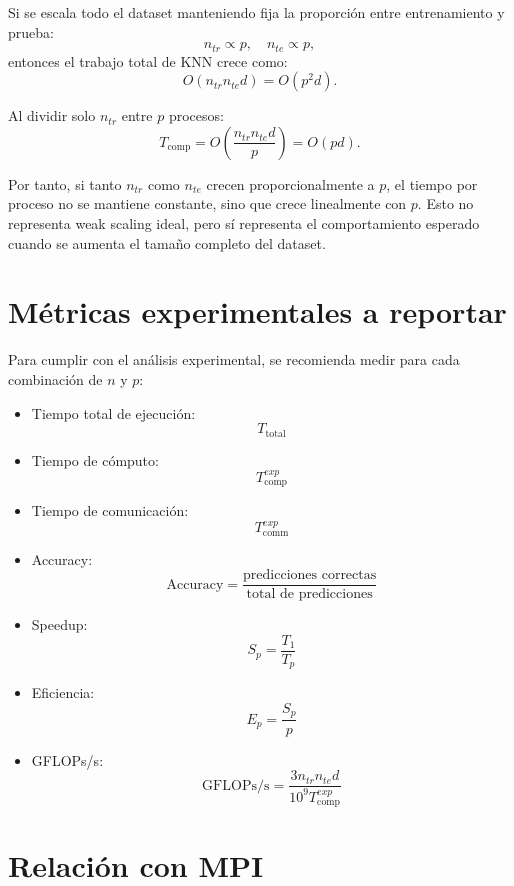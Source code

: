 \documentclass[11pt,a4paper]{article}
\begin{document}
Si se escala todo el dataset manteniendo fija la proporción entre entrenamiento y prueba:
\[
n_{tr} \propto p,
\quad
n_{te} \propto p,
\]
entonces el trabajo total de KNN crece como:
\[
O(n_{tr}n_{te}d) = O(p^2d).
\]

Al dividir solo $n_{tr}$ entre $p$ procesos:
\[
T_{\text{comp}}
=
O\left(
\frac{n_{tr}n_{te}d}{p}
\right)
=
O(pd).
\]

Por tanto, si tanto $n_{tr}$ como $n_{te}$ crecen proporcionalmente a $p$, el tiempo por proceso
no se mantiene constante, sino que crece linealmente con $p$. Esto no representa weak scaling
ideal, pero sí representa el comportamiento esperado cuando se aumenta el tamaño completo del
dataset.

\section{Métricas experimentales a reportar}

Para cumplir con el análisis experimental, se recomienda medir para cada combinación de
$n$ y $p$:

\begin{itemize}
    \item Tiempo total de ejecución:
    \[
    T_{\text{total}}
    \]
    
    \item Tiempo de cómputo:
    \[
    T_{\text{comp}}^{exp}
    \]
    
    \item Tiempo de comunicación:
    \[
    T_{\text{comm}}^{exp}
    \]
    
    \item Accuracy:
    \[
    \mathrm{Accuracy} =
    \frac{\text{predicciones correctas}}{\text{total de predicciones}}
    \]
    
    \item Speedup:
    \[
    S_p =
    \frac{T_1}{T_p}
    \]
    
    \item Eficiencia:
    \[
    E_p =
    \frac{S_p}{p}
    \]
    
    \item GFLOPs/s:
    \[
    \mathrm{GFLOPs/s}
    =
    \frac{3n_{tr}n_{te}d}{10^9T_{\text{comp}}^{exp}}
    \]
\end{itemize}

\section{Relación con MPI}
\end{document}
